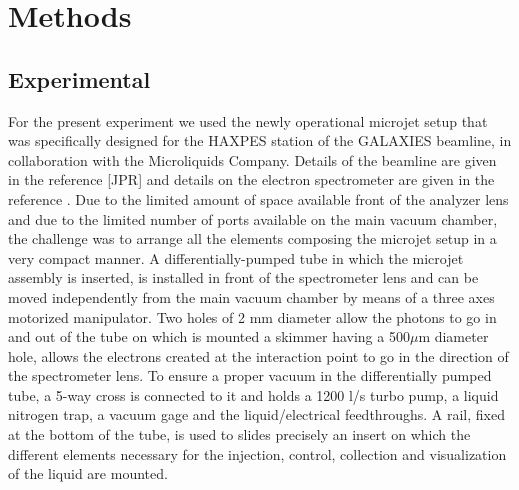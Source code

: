 \section{Methods} \label{sec:methods}
\subsection{Experimental}

For the present experiment we used the newly operational microjet setup that was specifically designed for the HAXPES station of the GALAXIES beamline, in collaboration with the Microliquids Company. Details of the beamline are given in the reference [JPR] and details on the electron spectrometer are given in the reference \citep{ceolin15:022502,ceolin13:188}. Due to the limited amount of space available  front of the analyzer lens and due to the limited number of ports available on the main vacuum chamber, the challenge was to arrange all the elements composing the microjet setup in a very compact manner. A differentially-pumped tube in which the microjet assembly is inserted, is installed in front of the spectrometer lens and can be moved independently from the main vacuum chamber by means of a three axes motorized manipulator. Two holes of 2 mm diameter allow the photons to go in and out of the tube on which is mounted a skimmer having a 500$\mu$m diameter hole, allows the electrons created at the interaction point to go in the direction of the spectrometer lens. To ensure a proper vacuum in the differentially pumped tube, a {\color{red}5-way cross} is connected to it and holds a 1200 l/s turbo pump, a liquid nitrogen trap, a vacuum gage and the liquid/electrical feedthroughs. A rail, fixed at the bottom of the tube, is used to {\kolya slides} precisely an insert on which the different elements necessary for the injection, control, collection and visualization of the liquid are mounted.


